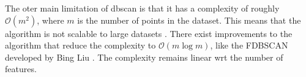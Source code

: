 The oter main limitation of \gls{dbscan} is that it has a complexity of roughly $\mathcal{O}(m^2)$, where $m$ is the number of points in the dataset. This means that the algorithm is not scalable to large datasets . There exist improvements to the algorithm that reduce the complexity to $\mathcal{O}(m\log m)$, like the FDBSCAN developed by Bing Liu \cite{dbscanlogm}. The complexity remains linear \gls{wrt} the number of features.
